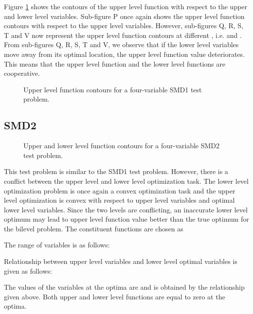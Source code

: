 \documentclass[twoside]{article}
\begin{document}
Figure \ref{fig:smd1} shows the contours of the upper level function with respect to the upper and lower level variables. Sub-figure P once again shows the upper level function contours with respect to the upper level variables. However, sub-figures Q, R, S, T and V now represent the upper level function contours at different , i.e.  and . From sub-figures Q, R, S, T and V, we observe that if the lower level variables move away from its optimal location, the upper level function value deteriorates. This means that the upper level function and the lower level functions are cooperative.

\begin{figure}
\begin{center}
\caption{Upper level function contours for a four-variable SMD1 test problem.}
\label{fig:smd1}
\end{center}
\end{figure}

\subsection{SMD2}

\begin{figure}
\begin{center}
\caption{Upper and lower level function contours for a four-variable SMD2 test problem.}
\label{fig:smd2-2}
\end{center}
\end{figure}

This test problem is similar to the SMD1 test problem. However, there is a conflict between the upper level and lower level optimization task. The lower level optimization problem is once again a convex optimization task and the upper level optimization is convex with respect to upper level variables and optimal lower level variables. Since the two levels are conflicting, an inaccurate lower level optimum may lead to upper level function value better than the true optimum for the bilevel problem. The constituent functions are chosen as

The range of variables is as follows:

Relationship between upper level variables and lower level optimal variables is given as follows:

The values of the variables at the optima are  and  is obtained by the relationship given above. Both upper and lower level functions are equal to zero at the optima.
\end{document}
